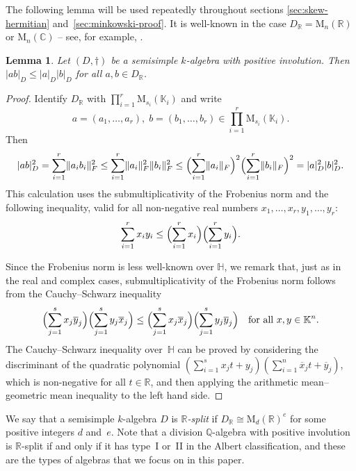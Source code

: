 \documentclass[JEP,XML,SOM,Unicode,NoFloatCountersInSection]{cedram}
\newcommand{\bC}{\mathbb{C}}
\newcommand{\bH}{\mathbb{H}}
\newcommand{\bK}{\mathbb{K}}
\newcommand{\bQ}{\mathbb{Q}}
\newcommand{\bR}{\mathbb{R}}
\newcommand{\rM}{\mathrm{M}}
\newcommand{\abs}[1]{\lvert #1 \rvert}
\newcommand{\length}[1]{\lVert #1 \rVert}
\let\ov\overline
\newcommand{\defterm}[1]{\emph{#1}}
\newtheorem{lemma}{Lemma}[section]
\begin{document}
The following lemma will be used repeatedly throughout sections \ref{sec:skew-hermitian} and~\ref{sec:minkowski-proof}. It is well-known in the case $D_\bR = \rM_n(\bR)$ or $\rM_n(\bC)$ -- see, for example, \cite[p.\,291]{HJ85}.

\begin{lemma} \label{length-submult}
Let $(D, \dag)$ be a semisimple $k$-algebra with positive involution.
Then $\abs{ab}_D \leq \abs{a}_D \abs{b}_D$ for all $a, b \in D_\bR$.
\end{lemma}

\begin{proof}
Identify $D_\bR$ with $\prod_{i=1}^r \rM_{s_i}(\bK_i)$ and write
\[
a = (a_1, \dotsc, a_r), \; b = (b_1, \dotsc, b_r) \in \prod_{i=1}^r \rM_{s_i}(\bK_i).
\]
Then
\[
\abs{ab}_D^2
= \sum_{i=1}^r \length{a_ib_i}_F^2
\leq \sum_{i=1}^r \length{a_i}_F^2 \length{b_i}_F^2
\leq \Bigl( \sum_{i=1}^r \length{a_i}_F \Bigr)^2 \Bigl( \sum_{i=1}^r \length{b_i}_F \Bigr)^2
= \abs{a}_D^2 \abs{b}_D^2.
\]
This calculation uses the submultiplicativity of the Frobenius norm and the following inequality, valid for all non-negative real numbers $x_1, \dotsc, x_r, y_1, \dotsc, y_r$:
\begin{equation} \label{eqn:sum-squares}
\sum_{i=1}^r x_iy_i \leq \Bigl( \sum_{i=1}^r x_i \Bigr) \Bigl( \sum_{i=1}^r y_i \Bigr).
\end{equation}

Since the Frobenius norm is less well-known over $\bH$, we remark that, just as in the real and complex cases, submultiplicativity of the Frobenius norm follows from the Cauchy--Schwarz inequality
\[
\Bigl( \sum_{j=1}^s x_j \ov{y}_j \Bigr) \Bigl( \sum_{j=1}^s y_j \ov{x}_j \Bigr) \leq \Bigl( \sum_{j=1}^s x_j \ov{x}_j \Bigr) \Bigl( \sum_{j=1}^s y_j \ov{y}_j \Bigr) \quad\text{for all } x, y \in \bK^n.
\]
The Cauchy--Schwarz inequality over~$\bH$ can be proved by considering the discriminant of the quadratic polynomial $(\sum_{i=1}^s x_j t + y_j)(\sum_{i=1}^n \ov{x}_j t + \ov{y}_j)$, which is non-negative for all $t \in \bR$, and then applying the arithmetic mean--geometric mean inequality to the left hand side.
\end{proof}

We say that a semisimple $k$-algebra $D$ is \defterm{$\bR$-split} if $D_\bR \cong \rM_d(\bR)^e$ for some positive integers $d$ and~$e$.
Note that a division $\bQ$-algebra with positive involution is $\bR$-split if and only if it has type~I or~II in the Albert classification, and these are the types of algebras that we focus on in this paper.
\end{document}
